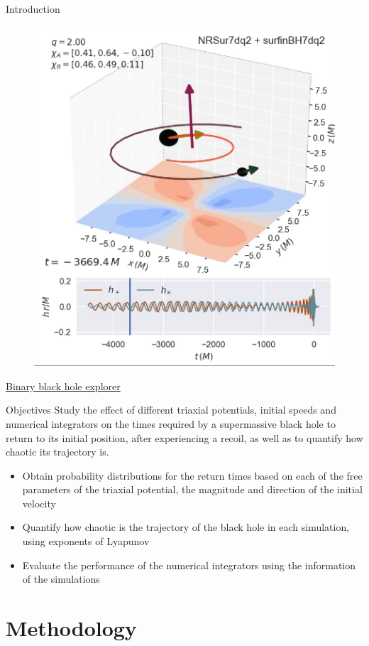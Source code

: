 \documentclass{beamer}
\begin{document}
\begin{frame}{Introduction}
	\begin{figure}
		\centering
		\includegraphics[width=0.4\linewidth]{images/example}
	\end{figure}
	\href{run:/home/juan/Documents/TesisFisica/Slides/images/super_kick.mp4}{Binary black hole explorer}
\end{frame}

\begin{frame}{Objectives}
	\small
	Study the effect of different triaxial potentials, initial speeds and numerical integrators on the times required by a supermassive black hole to return to its initial position, after experiencing a recoil, as well as to quantify how chaotic its trajectory is.
	
	\begin{itemize}
		\item Obtain probability distributions for the return times based on each of the free parameters of the triaxial potential, the magnitude and direction of the initial velocity
		\item Quantify how chaotic is the trajectory of the black hole in each simulation, using exponents of Lyapunov
		\item Evaluate the performance of the numerical integrators using the information of the simulations
	\end{itemize}
\end{frame}

\section{Methodology}
\end{document}
